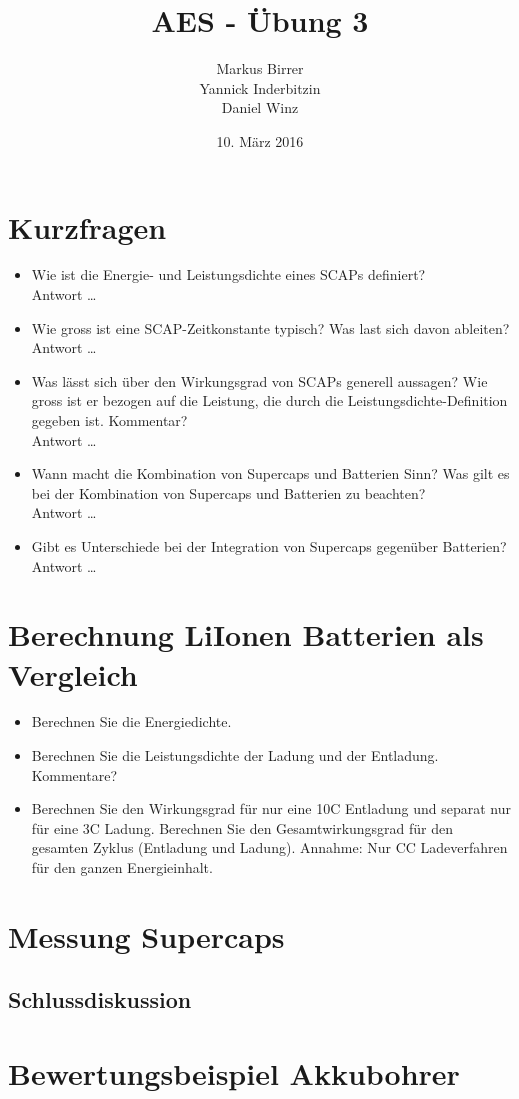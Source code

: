 \documentclass[a4,paper,fleqn]{article}
\title{AES - Übung 3}
\date{10. März 2016}
\author{Markus Birrer \\
        Yannick Inderbitzin\\
        Daniel Winz}
\begin{document}
\maketitle
\vfill
\tableofcontents
\vfill
\clearpage

\section{Kurzfragen}
\begin{itemize}
\item Wie ist die Energie- und Leistungsdichte eines SCAPs definiert? \\
    Antwort \ldots
\item Wie gross ist eine SCAP-Zeitkonstante typisch? Was last sich davon 
ableiten? \\
    Antwort \ldots
\item Was lässt sich über den Wirkungsgrad von SCAPs generell aussagen? Wie 
gross ist er bezogen auf die Leistung, die durch die 
Leistungsdichte-Definition gegeben ist. Kommentar? \\
    Antwort \ldots
\item Wann macht die Kombination von Supercaps und Batterien Sinn? Was gilt es 
bei der Kombination von Supercaps und Batterien zu beachten? \\
    Antwort \ldots
\item Gibt es Unterschiede bei der Integration von Supercaps gegenüber 
Batterien? \\
    Antwort \ldots
\end{itemize}

\section{Berechnung LiIonen Batterien als Vergleich}
\begin{itemize}
\item Berechnen Sie die Energiedichte. 
\item Berechnen Sie die Leistungsdichte der Ladung und der Entladung. 
Kommentare? 
\item  Berechnen Sie den Wirkungsgrad für nur eine 10C Entladung und separat 
nur für eine 3C Ladung.  Berechnen Sie den Gesamtwirkungsgrad für den 
gesamten Zyklus (Entladung und Ladung).  Annahme: Nur CC Ladeverfahren für 
den ganzen Energieinhalt. 
\end{itemize}

\section{Messung Supercaps}
\subsection{Schlussdiskussion}

\section{Bewertungsbeispiel Akkubohrer}
\end{document}
